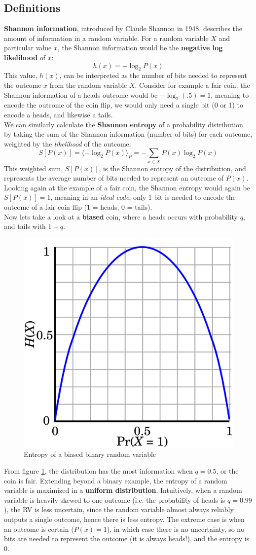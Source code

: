 \documentclass[12pt]{article}
\begin{document}
\subsection{Definitions}
\textbf{Shannon information}, introduced by Claude Shannon in 1948, describes the amount of information in a random variable. For a random variable $X$ and particular value $x$, the Shannon information would be the \textbf{negative log likelihood} of $x$:
$$h(x) = -\log_2P(x)$$
This value, $h(x)$, can be interpreted as the number of bits needed to represent the outcome $x$ from the random variable $X$. Consider for example a fair coin: the Shannon information of a heads outcome would be $-\log_2(.5) = 1$, meaning to encode the outcome of the coin flip, we would only need a single bit (0 or 1) to encode a heads, and likewise a tails.\\[10pt]
We can similarly calculate the \textbf{Shannon entropy} of a probability distribution by taking the sum of the Shannon information (number of bits) for each outcome, weighted by the \textit{likelihood} of the outcome:
$$S[P(x)] = \langle -\log_2P(x)\rangle_P = -\sum_{x\in X}P(x)\log_2P(x)$$
This weighted sum, $S[P(x)]$, is the Shannon entropy of the distribution, and represents the average number of bits needed to represent an outcome of $P(x)$. Looking again at the example of a fair coin, the Shannon entropy would again be $S[P(x)] = 1$, meaning in an \textit{ideal code}, only 1 bit is needed to encode the outcome of a fair coin flip (1 = heads, 0 = tails).\\[10pt]
Now lets take a look at a \textbf{biased} coin, where a heads occurs with probability $q$, and tails with $1-q$.
\begin{figure}[h]
    \centering
    \includegraphics[width = .4\linewidth]{entropy.png}
    \caption{Entropy of a biased binary random variable}
    \label{fig:entropy}
\end{figure}
From figure \ref{fig:entropy}, the distribution has the most information when $q=0.5$, or the coin is fair. Extending beyond a binary example, the entropy of a random variable is maximized in a \textbf{uniform distribution}. Intuitively, when a random variable is heavily skewed to one outcome (i.e. the probability of heads is $q=0.99$), the RV is less uncertain, since the random variable almost always reliably outputs a single outcome, hence there is less entropy. The extreme case is when an outcome is certain ($P(x) = 1$), in which case there is no uncertainty, so no bits are needed to represent the outcome (it is always heads!), and the entropy is 0.\\[10pt]
\end{document}
